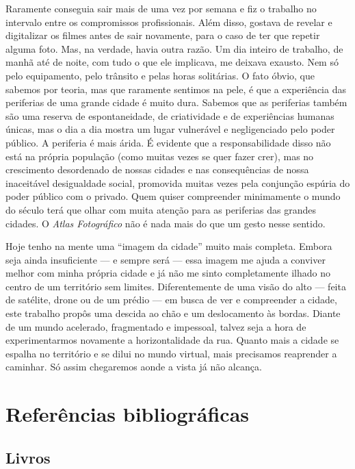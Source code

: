 Raramente conseguia sair mais de uma vez por semana e fiz o trabalho no
intervalo entre os compromissos profissionais. Além disso, gostava de
revelar e digitalizar os filmes antes de sair novamente, para o caso de
ter que repetir alguma foto. Mas, na verdade, havia outra razão. Um dia
inteiro de trabalho, de manhã até de noite, com tudo o que ele
implicava, me deixava exausto. Nem só pelo equipamento, pelo trânsito e
pelas horas solitárias. O fato óbvio, que sabemos por teoria, mas que raramente
sentimos na pele, é que a experiência das periferias de uma grande
cidade é muito dura. Sabemos que as periferias também são uma reserva de
espontaneidade, de criatividade e de experiências humanas únicas, mas o
dia a dia mostra um lugar vulnerável e negligenciado pelo poder público.
A periferia é mais árida. É evidente que a responsabilidade disso não
está na própria população (como muitas vezes se quer fazer crer), mas no
crescimento desordenado de nossas cidades e nas consequências de nossa
inaceitável desigualdade social, promovida muitas vezes pela conjunção
espúria do poder público com o privado. Quem quiser compreender
minimamente o mundo do século  terá que olhar com muita atenção para
as periferias das grandes cidades. O \emph{Atlas Fotográfico} não é nada
mais do que um gesto nesse sentido.

Hoje tenho na mente uma ``imagem da cidade'' muito mais completa. Embora
seja ainda insuficiente --- e sempre será --- essa imagem me ajuda a
conviver melhor com minha própria cidade e já não me sinto completamente
ilhado no centro de um território sem limites. Diferentemente de uma visão do alto --- feita de satélite, drone ou de um prédio --- em busca de ver e compreender a cidade, este trabalho propôs uma descida ao chão e um deslocamento às bordas. Diante de um mundo acelerado, fragmentado e impessoal, talvez seja a hora de experimentarmos novamente a horizontalidade da rua. Quanto mais a cidade se espalha no território e se dilui no mundo virtual, mais precisamos reaprender a caminhar. Só assim chegaremos aonde a vista já não alcança.

\chapter*{Referências bibliográficas}

\section{Livros}

